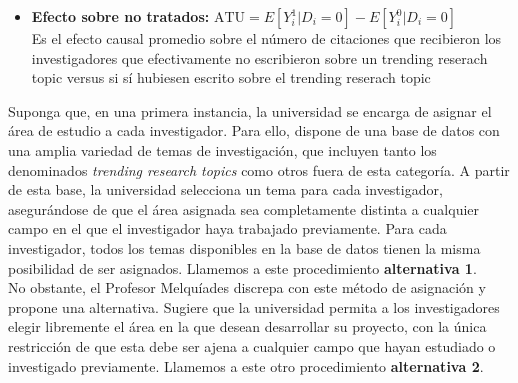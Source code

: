 \documentclass[a4paper, answers, addpoints, 11pt]{exam}
\begin{document}
\begin{itemize}
\begin{itemize}
\begin{mdframed}
\begin{itemize}
    \item \textbf{Efecto sobre no tratados:} \( \text{ATU} = E[Y_i^1 | D_i = 0] - E[Y_i^0 | D_i = 0] \)\\
          Es el efecto causal promedio sobre el número de citaciones que recibieron los investigadores que efectivamente no escribieron sobre un trending reserach topic versus  si sí hubiesen escrito sobre el trending reserach topic 
\end{itemize}

        \end{mdframed}
    \end{itemize}

\end{itemize}
\bigskip

Suponga que, en una primera instancia, la universidad se encarga de asignar el área de estudio a cada investigador. Para ello, dispone de una base de datos con una amplia variedad de temas de investigación, que incluyen tanto los denominados \textit{trending research topics} como otros fuera de esta categoría. A partir de esta base, la universidad selecciona un tema para cada investigador, asegurándose de que el área asignada sea completamente distinta a cualquier campo en el que el investigador haya trabajado previamente. Para cada investigador, todos los temas disponibles en la base de datos tienen la misma posibilidad de ser asignados. Llamemos a este procedimiento \textbf{alternativa 1}. \\

No obstante, el Profesor Melquíades discrepa con este método de asignación y propone una alternativa. Sugiere que la universidad permita a los investigadores elegir libremente el área en la que desean desarrollar su proyecto, con la única restricción de que esta debe ser ajena a cualquier campo que hayan estudiado o investigado previamente. Llamemos a este otro procedimiento \textbf{alternativa 2}.
\end{document}
